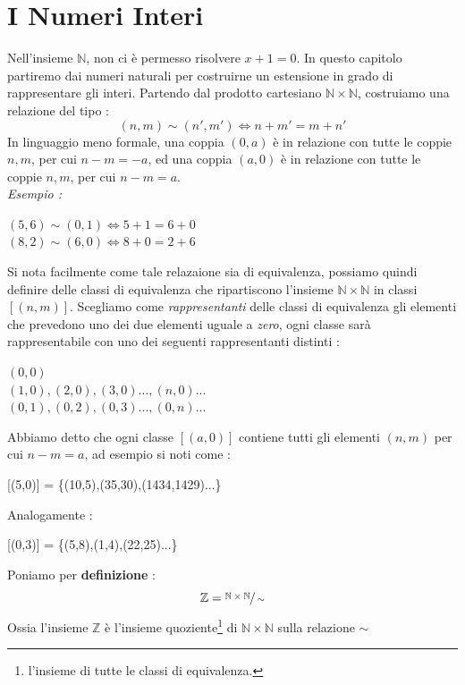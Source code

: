 \documentclass[12pt, letterpaper]{article}
\begin{document}
\section{I Numeri Interi}
Nell'insieme \(\mathbb{N}\), non ci è permesso risolvere \(x+1=0\). In questo capitolo partiremo dai numeri 
naturali per costruirne un estensione in grado di rappresentare gli interi. Partendo dal prodotto cartesiano 
\(\mathbb{N}\times\mathbb{N}\), costruiamo una relazione del tipo : 
\begin{equation}
    (n,m)\sim (n',m')\iff n+m' = m+n'
\end{equation}
In linguaggio meno formale, una coppia \((0,a)\) è in relazione con tutte le coppie \(n,m\), per cui \(n-m=-a\),
ed  una coppia \((a,0)\) è in relazione con tutte le coppie \(n,m\), per cui \(n-m=a\).\\
\textit{Esempio :}
\begin{center}
    \((5,6)\sim (0,1)\iff 5+1 = 6+0 \)\\\((8,2)\sim (6,0)\iff 8+0 = 2+6\)
\end{center}
Si nota facilmente come tale relazaione sia di equivalenza, possiamo quindi definire delle classi di equivalenza
che ripartiscono l'insieme \(\mathbb{N}\times\mathbb{N}\) in classi \([(n,m)]\). Scegliamo come \textit{rappresentanti}
delle classi di equivalenza gli elementi che prevedono uno dei due elementi uguale a \textit{zero}, ogni classe sarà 
rappresentabile con uno dei seguenti rappresentanti distinti :
\begin{center}
    \((0,0)\)\hphantom{\(,(2,0),(3,0)...,(n,0)...\)}\\\((1,0),(2,0),(3,0)...,(n,0)...\)
    \\\((0,1),(0,2),(0,3)...,(0,n)...\)
\end{center}
Abbiamo detto che ogni classe \([(a,0)]\) contiene tutti gli elementi \((n,m)\) per cui \(n-m=a\), ad esempio
si noti come : 
\begin{center}
    [(5,0)] = \{(10,5),(35,30),(1434,1429)...\}
\end{center}
Analogamente : 
\begin{center}
    [(0,3)] = \{(5,8),(1,4),(22,25)...\}
\end{center}
Poniamo per \textbf{definizione} : 
\begin{equation}
     \mathbb{Z} = \displaystyle\sfrac{\mathbb{N}\times\mathbb{N}}{\sim}
\end{equation}
\newpage Ossia l'insieme \( \mathbb{Z} \) è l'insieme quoziente\footnote{l'insieme di tutte le 
classi di equivalenza.} di \(\mathbb{N}\times\mathbb{N}\) sulla relazione \(\sim\)
\end{document}
